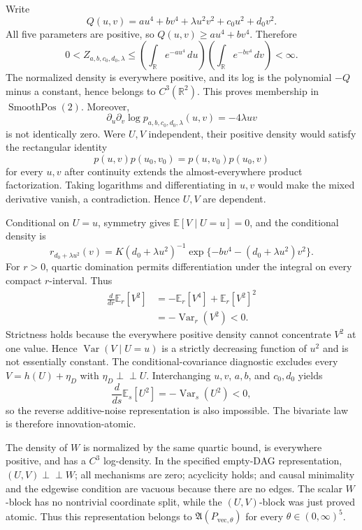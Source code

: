 Write
\[
 Q(u,v)=au^4+bv^4+\lambda u^2v^2+c_0u^2+d_0v^2.
\]
All five parameters are positive, so \(Q(u,v)\geq au^4+bv^4\).  Therefore
\[
 0<Z_{a,b,c_0,d_0,\lambda}
 \leq\left(\int_{\mathbb R}e^{-au^4}\,du\right)
      \left(\int_{\mathbb R}e^{-bv^4}\,dv\right)<\infty.
\]
The normalized density is everywhere positive, and its log is the polynomial \(-Q\) minus a constant, hence belongs to \(C^3(\mathbb R^2)\).  This proves membership in \(\operatorname{SmoothPos}(2)\).  Moreover,
\[
 \partial_u\partial_v\log p_{a,b,c_0,d_0,\lambda}(u,v)=-4\lambda uv
\]
is not identically zero.  Were \(U,V\) independent, their positive density would satisfy the rectangular identity
\[
 p(u,v)p(u_0,v_0)=p(u,v_0)p(u_0,v)
\]
for every \(u,v\) after continuity extends the almost-everywhere product factorization.  Taking logarithms and differentiating in \(u,v\) would make the mixed derivative vanish, a contradiction.  Hence \(U,V\) are dependent.

Conditional on \(U=u\), symmetry gives \(\mathbb E[V\mid U=u]=0\), and the conditional density is
\[
 r_{d_0+\lambda u^2}(v)
 =K(d_0+\lambda u^2)^{-1}\exp\{-bv^4-(d_0+\lambda u^2)v^2\}.
\]
For \(r>0\), quartic domination permits differentiation under the integral on every compact \(r\)-interval.  Thus
\[
 \begin{aligned}
 \frac{d}{dr}\mathbb E_r[V^2]
 &=-\mathbb E_r[V^4]+\mathbb E_r[V^2]^2\\
 &=-\operatorname{Var}_r(V^2)<0.
 \end{aligned}
\]
Strictness holds because the everywhere positive density cannot concentrate \(V^2\) at one value.  Hence \(\operatorname{Var}(V\mid U=u)\) is a strictly decreasing function of \(u^2\) and is not essentially constant.  The conditional-covariance diagnostic excludes every \(V=h(U)+\eta_D\) with \(\eta_D\perp\!\!\!\perp U\).  Interchanging \(u,v\), \(a,b\), and \(c_0,d_0\) yields
\[
 \frac{d}{ds}\mathbb E_s[U^2]=-\operatorname{Var}_s(U^2)<0,
\]
so the reverse additive-noise representation is also impossible.  The bivariate law is therefore innovation-atomic.

The density of \(W\) is normalized by the same quartic bound, is everywhere positive, and has a \(C^3\) log-density.  In the specified empty-DAG representation, \((U,V)\perp\!\!\!\perp W\); all mechanisms are zero; acyclicity holds; and causal minimality and the edgewise condition are vacuous because there are no edges.  The scalar \(W\)-block has no nontrivial coordinate split, while the \((U,V)\)-block was just proved atomic.  Thus this representation belongs to \(\mathfrak A(P_{\mathrm{vec},\theta})\) for every \(\theta\in(0,\infty)^5\).